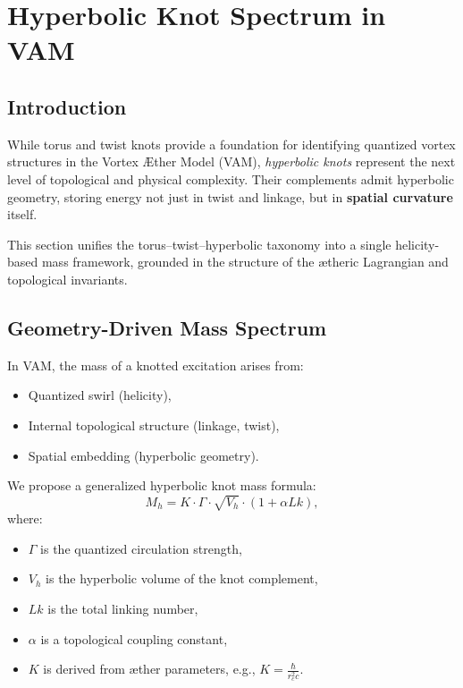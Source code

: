 \section{Hyperbolic Knot Spectrum in VAM}
\label{sec:hyperbolic_knot_spectrum}

        \subsection{Introduction}

        While torus and twist knots provide a foundation for identifying quantized vortex structures in the Vortex Æther Model (VAM), \emph{hyperbolic knots} represent the next level of topological and physical complexity. Their complements admit hyperbolic geometry, storing energy not just in twist and linkage, but in \textbf{spatial curvature} itself.

        This section unifies the torus--twist--hyperbolic taxonomy into a single helicity-based mass framework, grounded in the structure of the ætheric Lagrangian and topological invariants.

        \subsection{Geometry-Driven Mass Spectrum}

        In VAM, the mass of a knotted excitation arises from:
        \begin{itemize}
            \item Quantized swirl (helicity),
            \item Internal topological structure (linkage, twist),
            \item Spatial embedding (hyperbolic geometry).
        \end{itemize}

        We propose a generalized hyperbolic knot mass formula:
        \begin{equation}
            M_h = K \cdot \Gamma \cdot \sqrt{V_h} \cdot \left(1 + \alpha Lk\right),
        \end{equation}
        where:
        \begin{itemize}
            \item $\Gamma$ is the quantized circulation strength,
            \item $V_h$ is the hyperbolic volume of the knot complement,
            \item $Lk$ is the total linking number,
            \item $\alpha$ is a topological coupling constant,
            \item $K$ is derived from æther parameters, e.g., $K = \frac{\hbar}{r_c^2 c}$.
        \end{itemize}

